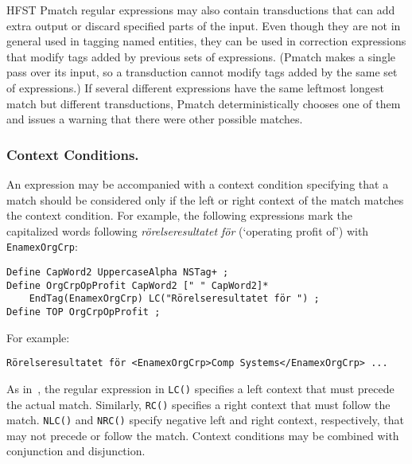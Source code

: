 \documentclass{llncs}
\begin{document}
HFST Pmatch regular expressions may also contain transductions that can add
extra output or discard specified parts of the input. Even though they
are not in general used in tagging named entities, they can be
used in correction expressions that modify tags added by previous sets
of expressions. (Pmatch makes a single pass over its input, so a
transduction cannot modify tags added by the same set of expressions.)
If several different expressions have the same leftmost longest match
but different transductions, Pmatch deterministically chooses one of
them and issues a warning that there were other possible matches.

\subsubsection{Context Conditions.}

An expression may be accompanied with a context
condition specifying that a match should be considered only if the
left or right context of the match matches the context condition. For
example, the
following expressions mark the capitalized words following
\textit{rörelseresultatet för} (`operating profit of') with
\texttt{EnamexOrgCrp}:

\begin{verbatim}
Define CapWord2 UppercaseAlpha NSTag+ ;
Define OrgCrpOpProfit CapWord2 [" " CapWord2]*
    EndTag(EnamexOrgCrp) LC("Rörelseresultatet för ") ;
Define TOP OrgCrpOpProfit ;
\end{verbatim}

\noindent
For example:
\begin{verbatim}
Rörelseresultatet för <EnamexOrgCrp>Comp Systems</EnamexOrgCrp> ...
\end{verbatim}

As in~\cite{karttunen/2011}, the regular expression in \texttt{LC()}
specifies a left context that must precede the actual match.
Similarly, \texttt{RC()}
specifies a right context that must follow the match. \texttt{NLC()}
and \texttt{NRC()} specify negative left and right context,
respectively, that may not precede or follow the match.
Context conditions may be combined with conjunction and disjunction.


\end{document}
